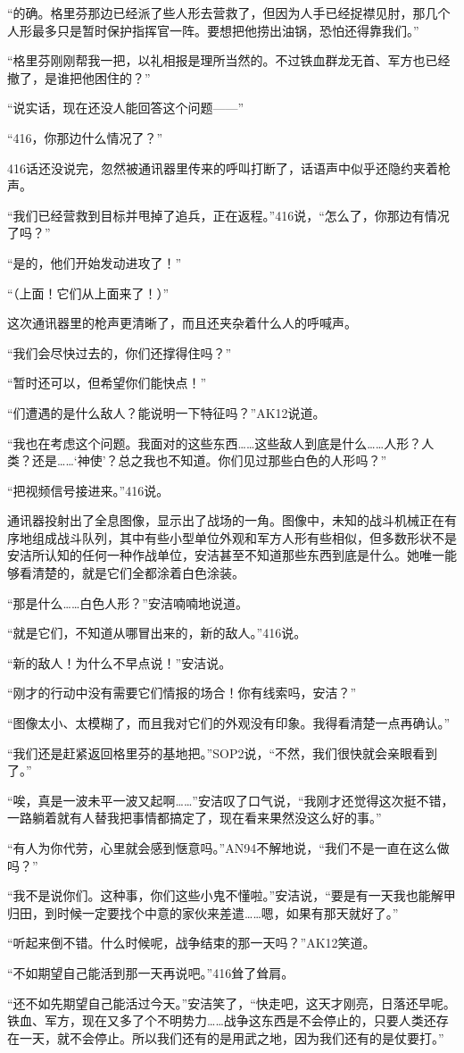 “的确。格里芬那边已经派了些人形去营救了，但因为人手已经捉襟见肘，那几个人形最多只是暂时保护指挥官一阵。要想把他捞出油锅，恐怕还得靠我们。”

“格里芬刚刚帮我一把，以礼相报是理所当然的。不过铁血群龙无首、军方也已经撤了，是谁把他困住的？”

“说实话，现在还没人能回答这个问题——”

“416，你那边什么情况了？”

416话还没说完，忽然被通讯器里传来的呼叫打断了，话语声中似乎还隐约夹着枪声。

“我们已经营救到目标并甩掉了追兵，正在返程。”416说，“怎么了，你那边有情况了吗？”

“是的，他们开始发动进攻了！”

“（上面！它们从上面来了！）”

这次通讯器里的枪声更清晰了，而且还夹杂着什么人的呼喊声。

“我们会尽快过去的，你们还撑得住吗？”

“暂时还可以，但希望你们能快点！”

“们遭遇的是什么敌人？能说明一下特征吗？”AK12说道。

“我也在考虑这个问题。我面对的这些东西……这些敌人到底是什么……人形？人类？还是……‘神使’？总之我也不知道。你们见过那些白色的人形吗？”

“把视频信号接进来。”416说。

通讯器投射出了全息图像，显示出了战场的一角。图像中，未知的战斗机械正在有序地组成战斗队列，其中有些小型单位外观和军方人形有些相似，但多数形状不是安洁所认知的任何一种作战单位，安洁甚至不知道那些东西到底是什么。她唯一能够看清楚的，就是它们全都涂着白色涂装。

“那是什么……白色人形？”安洁喃喃地说道。

“就是它们，不知道从哪冒出来的，新的敌人。”416说。

“新的敌人！为什么不早点说！”安洁说。

“刚才的行动中没有需要它们情报的场合！你有线索吗，安洁？”

“图像太小、太模糊了，而且我对它们的外观没有印象。我得看清楚一点再确认。”

“我们还是赶紧返回格里芬的基地把。”SOP2说，“不然，我们很快就会亲眼看到了。”

“唉，真是一波未平一波又起啊……”安洁叹了口气说，“我刚才还觉得这次挺不错，一路躺着就有人替我把事情都搞定了，现在看来果然没这么好的事。”

“有人为你代劳，心里就会感到惬意吗。”AN94不解地说，“我们不是一直在这么做吗？”

“我不是说你们。这种事，你们这些小鬼不懂啦。”安洁说，“要是有一天我也能解甲归田，到时候一定要找个中意的家伙来差遣……嗯，如果有那天就好了。”

“听起来倒不错。什么时候呢，战争结束的那一天吗？”AK12笑道。

“不如期望自己能活到那一天再说吧。”416耸了耸肩。

“还不如先期望自己能活过今天。”安洁笑了，“快走吧，这天才刚亮，日落还早呢。铁血、军方，现在又多了个不明势力……战争这东西是不会停止的，只要人类还存在一天，就不会停止。所以我们还有的是用武之地，因为我们还有的是仗要打。”